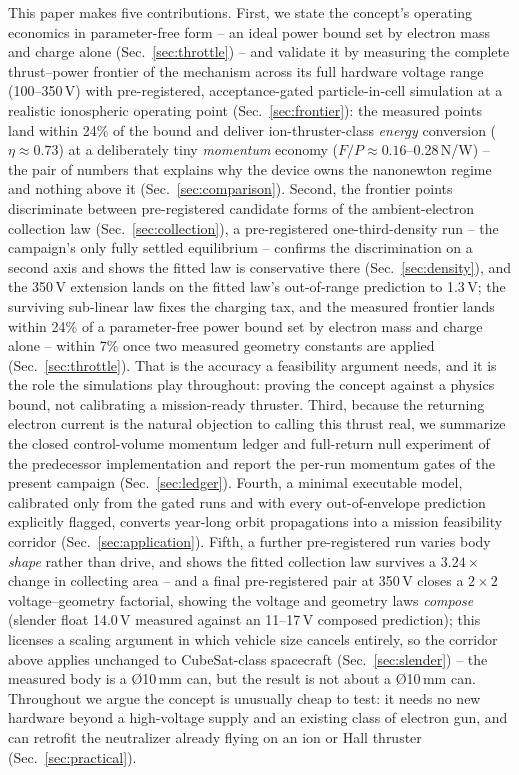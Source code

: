 \documentclass[11pt]{article}
\begin{document}
This paper makes five contributions. First, we state the concept's
operating economics in parameter-free form -- an ideal power bound set by
electron mass and charge alone (Sec.~\ref{sec:throttle}) -- and validate
it by measuring the complete thrust--power frontier of the mechanism
across its full hardware voltage range (100--350\,V) with pre-registered,
acceptance-gated particle-in-cell simulation at a realistic ionospheric
operating point (Sec.~\ref{sec:frontier}): the measured points land within
24\% of the bound and deliver ion-thruster-class \emph{energy} conversion
($\eta \approx 0.73$) at a deliberately tiny \emph{momentum} economy
($F/P \approx 0.16$--0.28\,\textmu N/W) -- the pair of numbers that
explains why the device owns the nanonewton regime and nothing above it
(Sec.~\ref{sec:comparison}). Second, the frontier
points discriminate between pre-registered candidate forms of the
ambient-electron collection law (Sec.~\ref{sec:collection}), a
pre-registered one-third-density run -- the campaign's only fully settled
equilibrium -- confirms the discrimination on a second axis and shows the
fitted law is conservative there (Sec.~\ref{sec:density}), and the
350\,V extension lands on the fitted law's out-of-range prediction to
1.3\,V; the surviving
sub-linear law fixes the charging tax, and the measured frontier lands
within 24\% of a parameter-free power bound set by electron mass and charge
alone -- within 7\% once two measured geometry constants are applied
(Sec.~\ref{sec:throttle}). That is the accuracy a feasibility argument
needs, and it is the role the simulations play throughout: proving the
concept against a physics bound, not calibrating a mission-ready thruster.
Third, because the returning electron current is the natural
objection to calling this thrust real, we summarize the closed
control-volume momentum ledger and full-return null experiment of the
predecessor implementation and report the per-run momentum gates of the
present campaign (Sec.~\ref{sec:ledger}). Fourth, a minimal executable
model, calibrated only from the gated runs and with every out-of-envelope
prediction explicitly flagged, converts year-long orbit propagations into a
mission feasibility corridor (Sec.~\ref{sec:application}). Fifth, a further
pre-registered run varies body \emph{shape} rather than drive, and shows the
fitted collection law survives a $3.24\times$ change in collecting area --
and a final pre-registered pair at 350\,V closes a $2{\times}2$
voltage--geometry factorial, showing the voltage and geometry laws
\emph{compose} (slender float 14.0\,V measured against an 11--17\,V
composed prediction); this
licenses a scaling argument in which vehicle size cancels entirely, so the
corridor above applies unchanged to CubeSat-class spacecraft
(Sec.~\ref{sec:slender}) -- the measured body is a \O10\,mm can, but the
result is not about a \O10\,mm can. Throughout we
argue the concept is unusually cheap to test: it needs no new hardware
beyond a high-voltage supply and an existing class of electron gun, and can
retrofit the neutralizer already flying on an ion or Hall thruster
(Sec.~\ref{sec:practical}).
\end{document}
